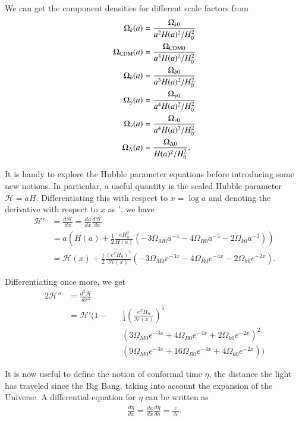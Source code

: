 \documentclass{aa}
\begin{document}
We can get the component densities for different scale factors from
\begin{equation}
\label{eq:omegas}
\begin{aligned}
\Omega_{k}(a) &= \frac{\Omega_{k0}}{a^2H(a)^2/H_0^2}\\
\Omega_{\rm CDM}(a) &= \frac{\Omega_{\rm CDM 0}}{a^3H(a)^2/H_0^2} \\
\Omega_b(a) &= \frac{\Omega_{b 0}}{a^3H(a)^2/H_0^2} \\
\Omega_\gamma(a) &= \frac{\Omega_{\gamma 0}}{a^4H(a)^2/H_0^2} \\
\Omega_{\nu}(a) &= \frac{\Omega_{\nu 0}}{a^4H(a)^2/H_0^2} \\
\Omega_{\Lambda}(a) &= \frac{\Omega_{\Lambda 0}}{H(a)^2/H_0^2}.
\end{aligned}
\end{equation}

It is handy to explore the Hubble parameter equations before introducing some new notions. In particular, a useful quantity is the scaled Hubble parameter $\mathcal H = aH$. Differentiating this with respect to $x = \log a$ and denoting the derivative with respect to $x$ as ', we have
\begin{align}
    \mathcal H' &= \frac{d\mathcal H}{dx} = \frac{da}{dx}\frac{d\mathcal H}{da}\\ 
    &= a\left( H(a) + \frac{1}{2}\frac{aH_0^2}{ H(a)} (-3\Omega_{M0} a^{-4} - 4\Omega_{R0}a^{-5}-2\Omega_{k0}a^{-3})\right)\\
    &= \mathcal H(x) +\frac{1}{2}\frac{(e^xH_0)^2}{\mathcal H(x)}(-3\Omega_{M0} e^{-3x} - 4 \Omega_{R0}e^{-4x}-2\Omega_{k0}e^{-2x}).
\end{align}

Differentiating once more, we get
\begin{alignat*}{2}
    \mathcal H'' &= \frac{d^2\mathcal H}{dx^2}&&\\ 
    &= \mathcal H'\Bigg(1-&&\frac{1}{4}\left(\frac{e^xH_0}{\mathcal H(x)}\right)^5\\
    & &&(3\Omega_{M0}e^{-3x}+4\Omega_{R0}e^{-4x}+2\Omega_{k0}e^{-2x})^2\\
    & &&(9\Omega_{M0}e^{-3x}+16\Omega_{R0}e^{-4x}+4\Omega_{k0}e^{-2x})\Bigg)
\end{alignat*}

It is now useful to define the notion of conformal time $\eta$, the distance the light has traveled since the Big Bang, taking into account the expansion of the Universe. A differential equation for $\eta$ can be written as
\begin{align}
\frac{d\eta}{dx} = \frac{da}{dx}\frac{d\eta}{da} = \frac{c}{\mathcal{H}}.
\end{align}
\end{document}
